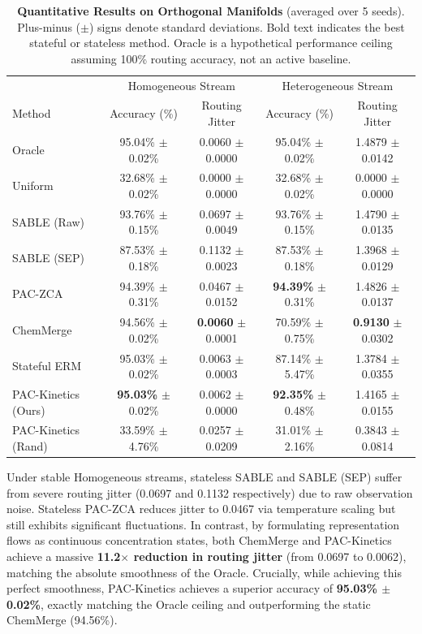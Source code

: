 \begin{table}[t]
\caption{\textbf{Quantitative Results on Orthogonal Manifolds} (averaged over 5 seeds). Plus-minus ($\pm$) signs denote standard deviations. Bold text indicates the best stateful or stateless method. Oracle is a hypothetical performance ceiling assuming 100\% routing accuracy, not an active baseline.}
\label{tab:orthogonal_results}
\vskip 0.15in
\begin{center}
\begin{small}
\begin{sc}
\begin{tabular}{lcccc}
\toprule
 & \multicolumn{2}{c}{Homogeneous Stream} & \multicolumn{2}{c}{Heterogeneous Stream} \\
Method & Accuracy (\%) & Routing Jitter & Accuracy (\%) & Routing Jitter \\
\midrule
Oracle & 95.04\% $\pm$ 0.02\% & 0.0060 $\pm$ 0.0000 & 95.04\% $\pm$ 0.02\% & 1.4879 $\pm$ 0.0142 \\
Uniform & 32.68\% $\pm$ 0.02\% & 0.0000 $\pm$ 0.0000 & 32.68\% $\pm$ 0.02\% & 0.0000 $\pm$ 0.0000 \\
\midrule
SABLE (Raw) & 93.76\% $\pm$ 0.15\% & 0.0697 $\pm$ 0.0049 & 93.76\% $\pm$ 0.15\% & 1.4790 $\pm$ 0.0135 \\
SABLE (SEP) & 87.53\% $\pm$ 0.18\% & 0.1132 $\pm$ 0.0023 & 87.53\% $\pm$ 0.18\% & 1.3968 $\pm$ 0.0129 \\
PAC-ZCA & 94.39\% $\pm$ 0.31\% & 0.0467 $\pm$ 0.0152 & \textbf{94.39\%} $\pm$ 0.31\% & 1.4826 $\pm$ 0.0137 \\
\midrule
ChemMerge & 94.56\% $\pm$ 0.02\% & \textbf{0.0060} $\pm$ 0.0001 & 70.59\% $\pm$ 0.75\% & \textbf{0.9130} $\pm$ 0.0302 \\
Stateful ERM & 95.03\% $\pm$ 0.02\% & 0.0063 $\pm$ 0.0003 & 87.14\% $\pm$ 5.47\% & 1.3784 $\pm$ 0.0355 \\
PAC-Kinetics (Ours) & \textbf{95.03\%} $\pm$ 0.02\% & 0.0062 $\pm$ 0.0000 & \textbf{92.35\%} $\pm$ 0.48\% & 1.4165 $\pm$ 0.0155 \\
PAC-Kinetics (Rand) & 33.59\% $\pm$ 4.76\% & 0.0257 $\pm$ 0.0209 & 31.01\% $\pm$ 2.16\% & 0.3843 $\pm$ 0.0814 \\
\bottomrule
\end{tabular}
\end{sc}
\end{small}
\end{center}
\vskip -0.1in
\end{table}

Under stable Homogeneous streams, stateless SABLE and SABLE (SEP) suffer from severe routing jitter (0.0697 and 0.1132 respectively) due to raw observation noise. Stateless PAC-ZCA reduces jitter to 0.0467 via temperature scaling but still exhibits significant fluctuations. In contrast, by formulating representation flows as continuous concentration states, both ChemMerge and PAC-Kinetics achieve a massive \textbf{11.2$\times$ reduction in routing jitter} (from 0.0697 to 0.0062), matching the absolute smoothness of the Oracle. Crucially, while achieving this perfect smoothness, PAC-Kinetics achieves a superior accuracy of \textbf{95.03\% $\pm$ 0.02\%}, exactly matching the Oracle ceiling and outperforming the static ChemMerge (94.56\%).

